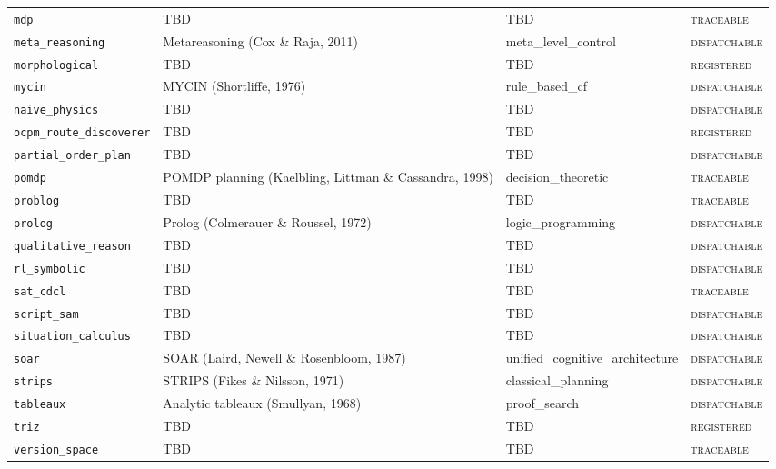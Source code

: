 \documentclass[11pt,oneside]{report}
\begin{document}
\begin{small}
\begin{longtable}{p{3.4cm}p{5.6cm}p{3.4cm}l}
\texttt{mdp} & TBD & TBD & \textsc{traceable} \\
\texttt{meta\_reasoning} & Metareasoning (Cox \& Raja, 2011) & meta\_level\_control & \textsc{dispatchable} \\
\texttt{morphological} & TBD & TBD & \textsc{registered} \\
\texttt{mycin} & MYCIN (Shortliffe, 1976) & rule\_based\_cf & \textsc{dispatchable} \\
\texttt{naive\_physics} & TBD & TBD & \textsc{dispatchable} \\
\texttt{ocpm\_route\_discoverer} & TBD & TBD & \textsc{registered} \\
\texttt{partial\_order\_plan} & TBD & TBD & \textsc{dispatchable} \\
\texttt{pomdp} & POMDP planning (Kaelbling, Littman \& Cassandra, 1998) & decision\_theoretic & \textsc{traceable} \\
\texttt{problog} & TBD & TBD & \textsc{traceable} \\
\texttt{prolog} & Prolog (Colmerauer \& Roussel, 1972) & logic\_programming & \textsc{dispatchable} \\
\texttt{qualitative\_reason} & TBD & TBD & \textsc{dispatchable} \\
\texttt{rl\_symbolic} & TBD & TBD & \textsc{dispatchable} \\
\texttt{sat\_cdcl} & TBD & TBD & \textsc{traceable} \\
\texttt{script\_sam} & TBD & TBD & \textsc{dispatchable} \\
\texttt{situation\_calculus} & TBD & TBD & \textsc{dispatchable} \\
\texttt{soar} & SOAR (Laird, Newell \& Rosenbloom, 1987) & unified\_cognitive\_architecture & \textsc{dispatchable} \\
\texttt{strips} & STRIPS (Fikes \& Nilsson, 1971) & classical\_planning & \textsc{dispatchable} \\
\texttt{tableaux} & Analytic tableaux (Smullyan, 1968) & proof\_search & \textsc{dispatchable} \\
\texttt{triz} & TBD & TBD & \textsc{registered} \\
\texttt{version\_space} & TBD & TBD & \textsc{traceable} \\
\end{longtable}
\end{small}
\end{document}
